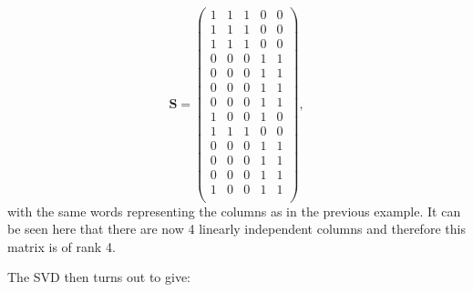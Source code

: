 \documentclass[11pt,a4paper]{article}
\begin{document}
\begin{equation}
\mathbf{S} = 
\begin{pmatrix}
1 & 1 & 1 & 0 & 0\\
1 & 1 & 1 & 0 & 0\\
1 & 1 & 1 & 0 & 0\\
0 & 0 & 0 & 1 & 1\\
0 & 0 & 0 & 1 & 1\\
0 & 0 & 0 & 1 & 1\\
0 & 0 & 0 & 1 & 1\\
1 & 0 & 0 & 1 & 0\\
1 & 1 & 1 & 0 & 0\\
0 & 0 & 0 & 1 & 1\\
0 & 0 & 0 & 1 & 1\\
0 & 0 & 0 & 1 & 1\\
1 & 0 & 0 & 1 & 1\\
\end{pmatrix},
\end{equation}
with the same words representing the columns as in the previous example. It can be seen here that there are now 4 linearly independent columns and therefore this matrix is of rank 4. 

The SVD then turns out to give:
\end{document}
